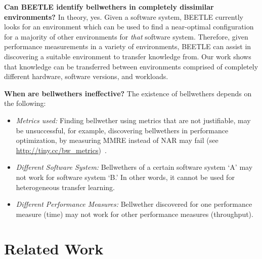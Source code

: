 \documentclass[10pt,journal,compsoc]{IEEEtran}
\newcommand{\bi}{\begin{itemize}}
\newcommand{\ei}{\end{itemize}}
\begin{document}
\noindent\textbf{Can BEETLE identify bellwethers in completely dissimilar environments?}
In theory, yes. Given a software system, BEETLE currently looks for an environment which can be used to find a near-optimal configuration for a majority of other environments for \textit{that} software system. Therefore, given performance measurements in a variety of environments, BEETLE can assist in discovering a suitable environment to transfer knowledge from. Our work shows that knowledge can be transferred between environments comprised of completely different hardware, software versions, and workloads.

\noindent\textbf{When are bellwethers ineffective?}
The existence of bellwethers depends on the following: 
\bi
\item
\textit{Metrics used:} Finding bellwether using metrics that are not justifiable, may be unsuccessful, for example, discovering bellwethers in performance optimization, by measuring MMRE instead of NAR may fail (see \url{http://tiny.cc/bw_metrics})~\cite{nair2017using}.
\item
\textit{Different Software System:} Bellwethers of a certain software system `A' may not work for software system `B.' In other words, it cannot be used for heterogeneous transfer learning.
\item
 \textit{Different Performance Measures: } Bellwether discovered for one performance measure (time) may not work for other performance measures (throughput).
\ei

\section{Related Work}
\label{sect:related}

\end{document}
